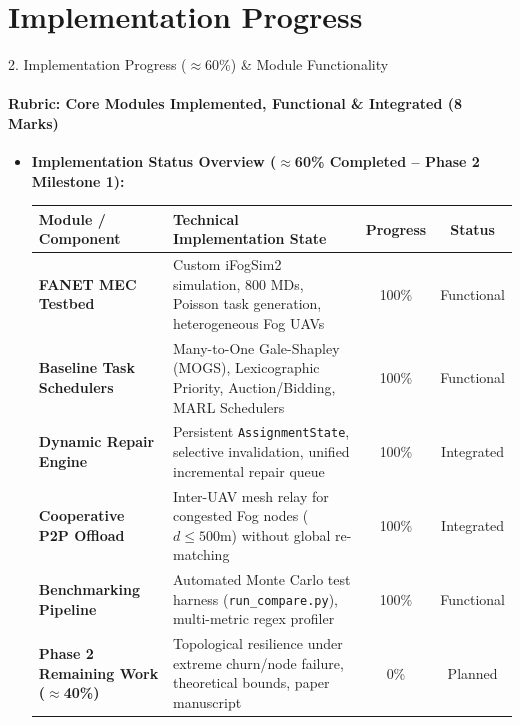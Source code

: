 \documentclass[aspectratio=169, 11pt]{beamer}
\begin{document}
\section{Implementation Progress}
\begin{frame}{2. Implementation Progress ($\approx$60\%) \& Module Functionality}
    \framesubtitle{Rubric: Core Modules Implemented, Functional \& Integrated (8 Marks)}
    \begin{itemize}\setlength{\itemsep}{1pt}
        \item \textbf{Implementation Status Overview ($\approx$60\% Completed -- Phase 2 Milestone 1):}
        \begin{table}
            \centering
            \scriptsize
            \renewcommand{\arraystretch}{1.12}
            \begin{tabular}{p{3.8cm} p{5.2cm} c c}
                \toprule
                \textbf{Module / Component} & \textbf{Technical Implementation State} & \textbf{Progress} & \textbf{Status} \\
                \midrule
                \textbf{FANET MEC Testbed} & Custom iFogSim2 simulation, 800 MDs, Poisson task generation, heterogeneous Fog UAVs & 100\% & Functional \\
                \textbf{Baseline Task Schedulers} & Many-to-One Gale-Shapley (MOGS), Lexicographic Priority, Auction/Bidding, MARL Schedulers & 100\% & Functional \\
                \textbf{Dynamic Repair Engine} & Persistent \texttt{AssignmentState}, selective invalidation, unified incremental repair queue & 100\% & Integrated \\
                \textbf{Cooperative P2P Offload} & Inter-UAV mesh relay for congested Fog nodes ($d \le 500$m) without global re-matching & 100\% & Integrated \\
                \textbf{Benchmarking Pipeline} & Automated Monte Carlo test harness (\texttt{run\_compare.py}), multi-metric regex profiler & 100\% & Functional \\
                \midrule
                \textbf{Phase 2 Remaining Work ($\approx$40\%)} & Topological resilience under extreme churn/node failure, theoretical bounds, paper manuscript & 0\% & Planned \\
                \bottomrule
            \end{tabular}
        \end{table}


\end{itemize}
\end{frame}
\end{document}
